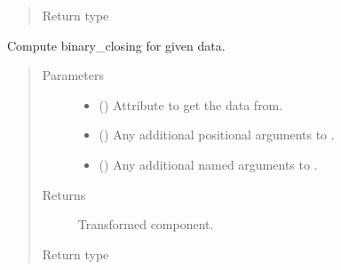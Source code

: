 \documentclass[letterpaper,10pt,english]{sphinxmanual}
\begin{document}
\begin{fulllineitems}
\begin{fulllineitems}
\begin{quote}
\begin{description}
\item[{Return type}] \leavevmode
{\hyperref[\detokenize{api/base_classes:geology.src.base_spatial.SpatialComponent}]{}}

\end{description}\end{quote}

\end{fulllineitems}


\begin{fulllineitems}
\label{\detokenize{api/base_classes:geology.src.base_spatial.SpatialComponent.binary_closing}}
Compute binary\_closing for given data.
\begin{quote}\begin{description}
\item[{Parameters}] \leavevmode\begin{itemize}
\item {} 
 (\sphinxstyleliteralemphasis{\sphinxupquote{, }}) \textendash{} Attribute to get the data from.

\item {} 
 () \textendash{} Any additional positional arguments to .

\item {} 
 () \textendash{} Any additional named arguments to .

\end{itemize}

\item[{Returns}] \leavevmode
{} \textendash{} Transformed component.

\item[{Return type}] \leavevmode
{\hyperref[\detokenize{api/base_classes:geology.src.base_spatial.SpatialComponent}]{}}


\end{description}
\end{quote}
\end{fulllineitems}
\end{fulllineitems}
\end{document}
